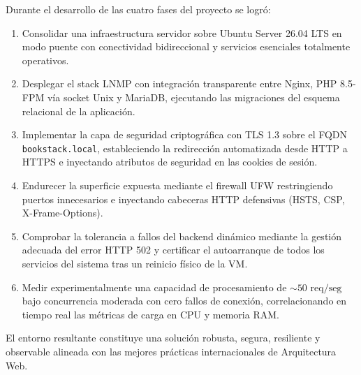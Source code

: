 \documentclass[12pt,a4paper]{article}
\begin{document}
Durante el desarrollo de las cuatro fases del proyecto se logró:
\begin{enumerate}[leftmargin=1.5em]
    \item Consolidar una infraestructura servidor sobre Ubuntu Server 26.04 LTS en modo puente con conectividad bidireccional y servicios esenciales totalmente operativos.
    \item Desplegar el stack LNMP con integración transparente entre Nginx, PHP 8.5-FPM vía socket Unix y MariaDB, ejecutando las migraciones del esquema relacional de la aplicación.
    \item Implementar la capa de seguridad criptográfica con TLS 1.3 sobre el FQDN \texttt{bookstack.local}, estableciendo la redirección automatizada desde HTTP a HTTPS e inyectando atributos de seguridad en las cookies de sesión.
    \item Endurecer la superficie expuesta mediante el firewall UFW restringiendo puertos innecesarios e inyectando cabeceras HTTP defensivas (HSTS, CSP, X-Frame-Options).
    \item Comprobar la tolerancia a fallos del backend dinámico mediante la gestión adecuada del error HTTP 502 y certificar el autoarranque de todos los servicios del sistema tras un reinicio físico de la VM.
    \item Medir experimentalmente una capacidad de procesamiento de $\sim 50\text{ req/seg}$ bajo concurrencia moderada con cero fallos de conexión, correlacionando en tiempo real las métricas de carga en CPU y memoria RAM.
\end{enumerate}

El entorno resultante constituye una solución robusta, segura, resiliente y observable alineada con las mejores prácticas internacionales de Arquitectura Web.








\end{document}
